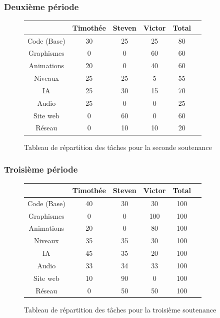 \documentclass[12pt]{article}
\begin{document}
\subsubsection{Deuxième période}

\begin{figure}[h]
\centering

\begin{tabular}{|c|c|c|c|c|c|}
\hline
 & Timothée & Steven & Victor & Total\\
\hline
Code (Base) & 30 & 25 & 25 & 80\\
\hline
Graphismes & 0 & 0 & 60 & 60\\
\hline
Animations & 20 & 0 & 40 & 60\\
\hline
Niveaux & 25 & 25 & 5 & 55\\
\hline
IA & 25 & 30 & 15 & 70\\
\hline
Audio & 25 & 0 & 0 & 25\\
\hline
Site web & 0 & 60 & 0 & 60\\
\hline
Réseau & 0 & 10 & 10 & 20\\
\hline
\end{tabular}

\caption{Tableau de répartition des tâches pour la seconde soutenance}
\end{figure}

\subsubsection{Troisième période}

\begin{figure}[h]
\centering

\begin{tabular}{|c|c|c|c|c|c|}
\hline
 & Timothée & Steven & Victor & Total\\
\hline
Code (Base) & 40 & 30 & 30 & 100\\
\hline
Graphismes & 0 & 0 & 100 & 100\\
\hline
Animations & 20 & 0 & 80 & 100\\
\hline
Niveaux & 35 & 35 & 30 & 100\\
\hline
IA & 45 & 35 & 20 & 100\\
\hline
Audio & 33 & 34 & 33 & 100\\
\hline
Site web & 10 & 90 & 0 & 100\\
\hline
Réseau & 0 & 50 & 50 & 100\\
\hline
\end{tabular}

\caption{Tableau de répartition des tâches pour la troisième soutenance}
\end{figure}
\end{document}
